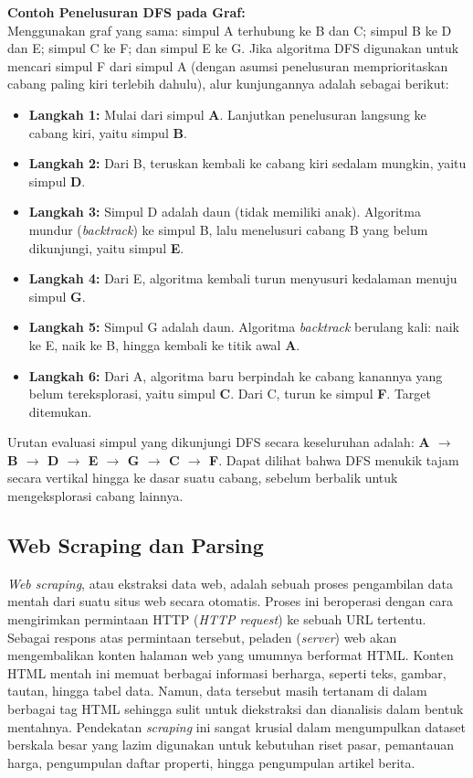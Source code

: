 \documentclass[12pt]{article}
\begin{document}
\vspace{0.3cm}
\noindent\textbf{Contoh Penelusuran DFS pada Graf:} \\
Menggunakan graf yang sama: simpul A terhubung ke B dan C; simpul B ke D dan E; simpul C ke F; dan simpul E ke G. Jika algoritma DFS digunakan untuk mencari simpul F dari simpul A (dengan asumsi penelusuran memprioritaskan cabang paling kiri terlebih dahulu), alur kunjungannya adalah sebagai berikut:
\begin{itemize}
    \item \textbf{Langkah 1:} Mulai dari simpul \textbf{A}. Lanjutkan penelusuran langsung ke cabang kiri, yaitu simpul \textbf{B}.
    \item \textbf{Langkah 2:} Dari B, teruskan kembali ke cabang kiri sedalam mungkin, yaitu simpul \textbf{D}.
    \item \textbf{Langkah 3:} Simpul D adalah daun (tidak memiliki anak). Algoritma mundur (\textit{backtrack}) ke simpul B, lalu menelusuri cabang B yang belum dikunjungi, yaitu simpul \textbf{E}.
    \item \textbf{Langkah 4:} Dari E, algoritma kembali turun menyusuri kedalaman menuju simpul \textbf{G}.
    \item \textbf{Langkah 5:} Simpul G adalah daun. Algoritma \textit{backtrack} berulang kali: naik ke E, naik ke B, hingga kembali ke titik awal \textbf{A}. 
    \item \textbf{Langkah 6:} Dari A, algoritma baru berpindah ke cabang kanannya yang belum tereksplorasi, yaitu simpul \textbf{C}. Dari C, turun ke simpul \textbf{F}. Target ditemukan.
\end{itemize}
Urutan evaluasi simpul yang dikunjungi DFS secara keseluruhan adalah: \textbf{A $\rightarrow$ B $\rightarrow$ D $\rightarrow$ E $\rightarrow$ G $\rightarrow$ C $\rightarrow$ F}. Dapat dilihat bahwa DFS menukik tajam secara vertikal hingga ke dasar suatu cabang, sebelum berbalik untuk mengeksplorasi cabang lainnya.
\subsection{Web Scraping dan Parsing}

\textit{Web scraping}, atau ekstraksi data web, adalah sebuah proses pengambilan data mentah dari suatu situs web secara otomatis. Proses ini beroperasi dengan cara mengirimkan permintaan HTTP (\textit{HTTP request}) ke sebuah URL tertentu. Sebagai respons atas permintaan tersebut, peladen (\textit{server}) web akan mengembalikan konten halaman web yang umumnya berformat HTML. Konten HTML mentah ini memuat berbagai informasi berharga, seperti teks, gambar, tautan, hingga tabel data. Namun, data tersebut masih tertanam di dalam berbagai tag HTML sehingga sulit untuk diekstraksi dan dianalisis dalam bentuk mentahnya. Pendekatan \textit{scraping} ini sangat krusial dalam mengumpulkan dataset berskala besar yang lazim digunakan untuk kebutuhan riset pasar, pemantauan harga, pengumpulan daftar properti, hingga pengumpulan artikel berita. 
\end{document}
